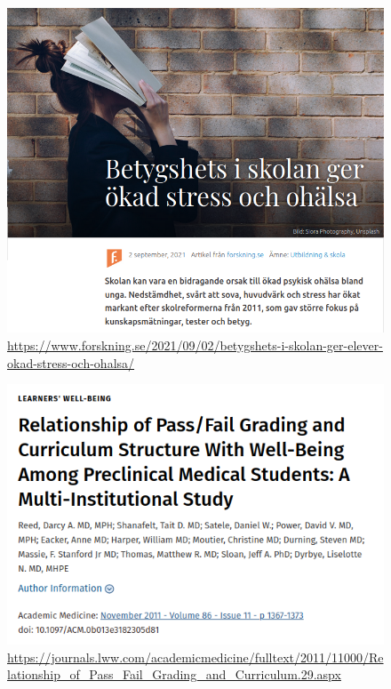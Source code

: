 \begin{frame}
  \begin{figure}
    \includegraphics[height=0.8\textheight]{betygshets.png}
    \caption{\url{https://www.forskning.se/2021/09/02/betygshets-i-skolan-ger-elever-okad-stress-och-ohalsa/}}
  \end{figure}
\end{frame}

\begin{frame}
  \begin{figure}
    \includegraphics[height=0.8\textheight]{grading-scales.png}
    \caption{\url{https://journals.lww.com/academicmedicine/fulltext/2011/11000/Relationship_of_Pass_Fail_Grading_and_Curriculum.29.aspx}}
  \end{figure}
\end{frame}

